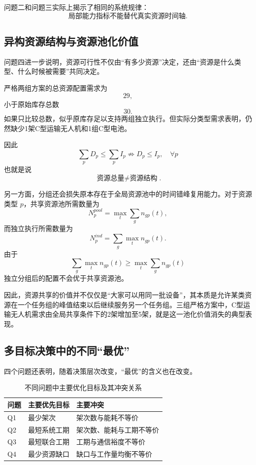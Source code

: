 \documentclass[UTF8,a4paper,12pt]{ctexart}
\begin{document}
问题二和问题三实际上揭示了相同的系统规律：
\[
\boxed{
\text{局部能力指标不能替代真实资源时间轴}
}.
\]

\subsection{异构资源结构与资源池化价值}

问题四进一步说明，资源可行性不仅由“有多少资源”决定，还由“资源是什么类型、什么时候被需要”共同决定。

严格两组方案的总资源配置需求为
\[
29,
\]
小于原始库存总数
\[
30.
\]
如果只比较总数，似乎原库存足以支持两组独立执行。但实际分类型需求表明，仍然缺少1架C型运输无人机和1组C型电池。

因此
\[
\boxed{
\sum_pD_p\le\sum_pI_p
\not\Rightarrow
D_p\le I_p,\quad\forall p
}
\]
也就是说
\[
\boxed{
\text{资源总量}
\neq
\text{资源结构}
}.
\]

另一方面，分组还会损失原本存在于全局资源池中的时间错峰复用能力。对于资源类型 $p$，共享资源池所需数量为
\[
N_p^{pool}
=
\max_t\sum_g n_{gp}(t),
\]
而独立执行所需数量为
\[
N_p^{ind}
=
\sum_g\max_t n_{gp}(t).
\]
由于
\[
\boxed{
\sum_g\max_t n_{gp}(t)
\ge
\max_t\sum_gn_{gp}(t)
}
\]
独立分组后的配置不会优于共享资源池。

因此，资源共享的价值并不仅仅是“大家可以用同一批设备”，其本质是允许某类资源在一个任务组的峰值结束以后继续服务另一个任务组。三组严格方案中，C型运输无人机需求由全局共享条件下的2架增加至5架，就是这一池化价值消失的典型表现。

\subsection{多目标决策中的不同“最优”}

四个问题还表明，随着决策层次改变，“最优”的含义也在改变。

\begin{table}[H]
\centering
\caption{不同问题中主要优化目标及其冲突关系}
\begin{tabular}{lll}
\toprule
问题 & 主要优先目标 & 主要冲突\\
\midrule
Q1 & 最少架次 & 架次数与能耗不等价\\
Q2 & 最短系统工期 & 架次数、能耗与工期不等价\\
Q3 & 最短联合工期 & 工期与通信裕度不等价\\
Q4 & 最少资源缺口 & 缺口与工作量均衡不等价\\
\bottomrule
\end{tabular}
\end{table}
\end{document}

